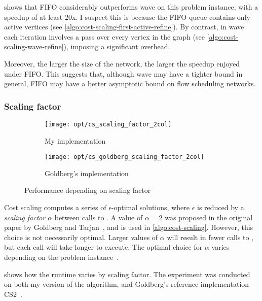  shows that FIFO considerably outperforms wave on this problem instance, with a speedup of at least 20x. I suspect this is because the FIFO queue contains only active vertices (see \cref{algo:cost-scaling-first-active-refine}). By contrast, in wave each iteration involves a pass over every vertex in the graph (see \cref{algo:cost-scaling-wave-refine}), imposing a significant overhead.

Moreover, the larger the size of the network, the larger the speedup enjoyed under FIFO. This suggests that, although wave may have a tighter bound in general, FIFO may have a better asymptotic bound on flow scheduling networks.


\subsubsection{Scaling factor}

\begin{figure}
    \begin{widepage}
    \begin{subfigure}[c]{0.5\textwidth}
        \texttt{[image: opt/cs\_scaling\_factor\_2col]}
        \caption{My implementation}
    \end{subfigure}
    \begin{subfigure}[c]{0.5\textwidth}
        \texttt{[image: opt/cs\_goldberg\_scaling\_factor\_2col]}
        \caption{Goldberg's implementation}
    \end{subfigure}
    \end{widepage}
    \caption{Performance depending on scaling factor}
    \label{fig:opt-cs-scaling-factor}
\end{figure}

Cost scaling computes a series of $\epsilon$-optimal solutions, where $\epsilon$ is reduced by a \emph{scaling factor} $\alpha$ between calls to . A value of $\alpha=2$ was proposed in the original paper by Goldberg and Tarjan~\cite{Goldberg:1987}, and is used in \cref{algo:cost-scaling}. However, this choice is not necessarily optimal. Larger values of $\alpha$ will result in fewer calls to , but each call will take longer to execute. The optimal choice for $\alpha$ varies depending on the problem instance~\cite[\S7]{Goldberg:1997}.

 shows how the runtime varies by scaling factor. %
The experiment was conducted on both my version of the algorithm, and Goldberg's reference implementation CS2~\cite{CS2:2009}.

